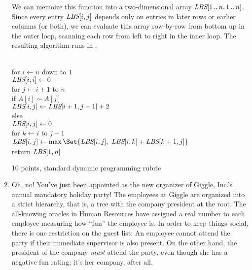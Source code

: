 \documentclass[11pt]{article}
\begin{document}
\begin{enumerate}
\begin{solution}
We can memoize this function into a two-dimensional array $\emph{LBS}[1\,..\,n,1\,..\,n]$.  Since every entry $\emph{LBS}[i,j]$ depends only on entries in later rows or earlier columns (or both), we can evaluate this array row-by-row from bottom up in the outer loop, scanning each row from left to right in the inner loop.  The resulting algorithm runs in .

\begin{algo}
	\+
\\	for $i\gets n$ down to $1$\+
\\		$\emph{LBS}[i,i] \gets 0$
\\		for $j \gets i+1$ to $n$\+
\\			if $A[i] \sim A[j]$\+
\\				$\emph{LBS}[i,j] \gets \emph{LBS}[i+1,j-1]+2$\-
\\			else\+
\\				$\emph{LBS}[i,j] \gets 0$\-
\\[0.5ex]
			for $k\gets i$ to $j-1$\+
\\				$\emph{LBS}[i,j] \gets \max
					\Set{\emph{LBS}[i,j],~\strut
						\emph{LBS}[i,k] + \emph{LBS}[k+1,j]}$\-\-\-
\\[0.5ex]
	return $\emph{LBS}[1,n]$
\end{algo}
\end{solution}
\begin{rubric}
10 points, standard dynamic programming rubric
\end{rubric}



\item 
Oh, no!  You’ve just been appointed as the new organizer of Giggle, Inc.'s annual mandatory holiday party! The employees at Giggle are organized into a strict hierarchy, that is, a tree with the company president at the root.  The all-knowing oracles in Human Resources have assigned a real number to each employee measuring how “fun” the employee is.  In order to keep things social, there is one restriction on the guest list: An employee cannot attend the party if their immediate supervisor is also present.  On the other hand, the president of the company \emph{must} attend the party, even though she has a negative fun rating; it's her company, after all.


\end{enumerate}
\end{document}

